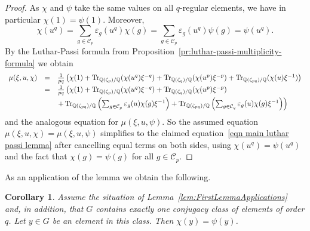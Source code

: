 \documentclass[11pt, a4paper]{amsart}
\newtheorem{corollary}[theorem]{Corollary}
\theoremstyle{definition}
\theoremstyle{definition}
\newcommand{\Tr}{\operatorname{Tr}}
\begin{document}
\begin{proof}
As $\chi$ and $\psi$ take the same values on all $q$-regular elements, we have in particular $\chi(1) = \psi(1)$. Moreover,
\[\chi(u^q) = \sum_{g \in \mathcal{C}_p} \varepsilon_g(u^q) \chi(g) =  \sum_{g \in \mathcal{C}_p} \varepsilon_g(u^q) \psi(g) = \psi(u^q). \]
By the Luthar-Passi formula from Proposition~\ref{pr:luthar-passi-multiplicity-formula} we obtain
\begin{equation}\label{eq:FirstLemmaApplication} 
\begin{array}{rcl}

\mu(\xi,u,\chi) &=& \frac{1}{pq}\left(\chi(1) + \Tr_{\mathbb{Q}(\zeta_p)/\mathbb{Q}}(\chi(u^q)\xi^{-q}) + \Tr_{\mathbb{Q}(\zeta_q)/\mathbb{Q}}(\chi(u^p)\xi^{-p}) + \Tr_{\mathbb{Q}(\zeta_{pq})/\mathbb{Q}}(\chi(u)\xi^{-1})\right) \vspace{3pt} \\
&=& \frac{1}{pq}\left(\chi(1) + \Tr_{\mathbb{Q}(\zeta_p)/\mathbb{Q}}(\chi(u^q)\xi^{-q}) + \Tr_{\mathbb{Q}(\zeta_q)/\mathbb{Q}}(\chi(u^p)\xi^{-p}) \right. \vspace{3pt}  \\&&\left.+ \Tr_{\mathbb{Q}(\zeta_{pq})/\mathbb{Q}}\left( \sum_{g \in \mathcal{C}_p}\varepsilon_g(u)\chi(g)\xi^{-1} \right) 
 + \Tr_{\mathbb{Q}(\zeta_{pq})/\mathbb{Q}}\left(\sum_{g \in \mathcal{C}_q}\varepsilon_g(u)\chi(g)\xi^{-1}\right)\right)
\end{array}
\end{equation}
and the analogous equation for $\mu(\xi, u, \psi)$. So the assumed equation $\mu(\xi, u,\chi) = \mu(\xi, u, \psi)$ simplifies to the claimed equation~\eqref{eqn main luthar passi lemma} after cancelling equal terms on both sides, using $\chi(u^q) = \psi(u^q)$ and the fact that $\chi(g) = \psi(g)$ for all $g \in \mathcal{C}_p$.	
\end{proof}

As an application of the lemma we obtain the following.

\begin{corollary}\label{cor:ChiYPsiY}
Assume the situation of Lemma~\ref{lem:FirstLemmaApplications} and, in addition, that $G$ contains exactly one conjugacy class of elements of order $q$. Let $y \in G$ be an element in this class. Then $\chi(y) = \psi(y)$.
\end{corollary}
\end{document}
